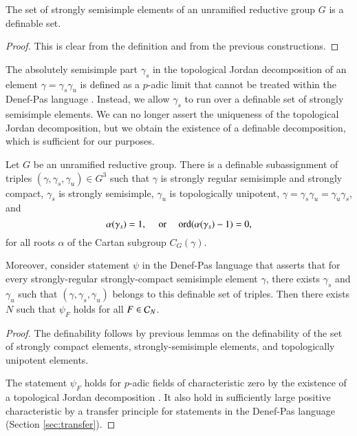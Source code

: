  \begin{lemma} The set of strongly semisimple elements of an
   unramified reductive group $G$ is a definable set.
   \end{lemma}

   \begin{proof} This is clear from the definition and from the
     previous constructions.
   \end{proof}

   \begin{remark} The absolutely semisimple part $\gamma_s$ in the
     topological Jordan decomposition of an element $\gamma = \gamma_s
     \gamma_u$ is defined as a $p$-adic limit that cannot be treated
     within the Denef-Pas language \cite{hales1993simple}.  Instead,
     we allow $\gamma_s$ to run over a definable set of strongly
     semisimple elements.  We can no longer assert the uniqueness of
     the topological Jordan decomposition, but we obtain the existence
     of a definable decomposition, which is sufficient for our
     purposes.
    \end{remark}


\begin{lemma} 
  Let $G$ be an unramified reductive group.  There is a definable
  subassignment of triples $(\gamma,\gamma_s,\gamma_u)\in G^3$ such
  that $\gamma$ is strongly regular semisimple and strongly compact,
  $\gamma_s$ is strongly semisimple,
  $\gamma_u$ is
  topologically unipotent, 
  $\gamma = \gamma_s \gamma_u = \gamma_u\gamma_s$,  and
\[
\alpha(\gamma_s)=1,
\quad\text{ or }
\quad {\operatorname{ord}}(\alpha(\gamma_s)-1)=0,
\]
for all  roots $\alpha$ of the Cartan subgroup $C_G(\gamma)$.

Moreover, consider statement $\psi$ in the Denef-Pas language that
asserts that for every strongly-regular strongly-compact semisimple
element $\gamma$, there exists $\gamma_s$ and $\gamma_u$ such that
$(\gamma,\gamma_s,\gamma_u)$ belongs to this definable set of triples.
Then there exists $N$ such that $\psi_F$ holds for all $F\in \mathcal C_N$.
\end{lemma}

\begin{proof} The definability follows by previous lemmas on the
  definability of the set of strongly compact elements,
  strongly-semisimple elements, and topologically unipotent elements.

The statement $\psi_F$ holds for $p$-adic fields of characteristic
zero by the existence of a topological Jordan decomposition
\cite{hales1993simple}.  It also hold in sufficiently large positive
characteristic by a transfer principle for statements in the Denef-Pas
language (Section \ref{sec:transfer}).
\end{proof}


